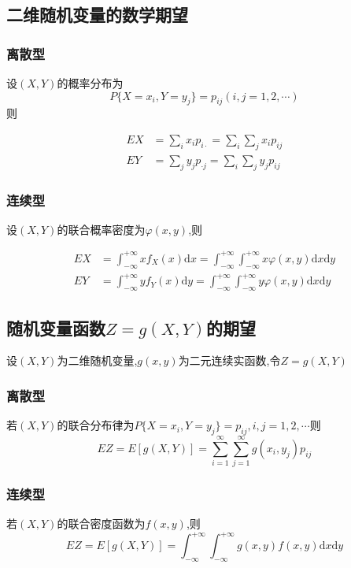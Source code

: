 \documentclass[UTF8]{ctexart}
\theoremstyle{remark}
\begin{document}
		\subsection{二维随机变量的数学期望}
		\subsubsection{离散型}
		设\((X,Y)\)的概率分布为
		\[P\{X = x_i, Y = y_j\} = p_{ij} (i,j = 1,2,\cdots)\]
		则
		
		\begin{align*}
			EX&=\sum_{i} x_i p_{i\cdot}=\sum_{i}\sum_{j} x_i p_{ij}\\
			EY&=\sum_{j} y_j p_{\cdot j}=\sum_{i}\sum_{j} y_j p_{ij}
		\end{align*}
		
		
		\subsubsection{连续型}
		设\((X,Y)\)的联合概率密度为\(\varphi(x,y)\),则
		
		\begin{align*}
			EX&=\int_{-\infty}^{+\infty} x f_X(x) \mathrm{d}x=\int_{-\infty}^{+\infty}\int_{-\infty}^{+\infty} x\varphi(x,y) \mathrm{d}x\mathrm{d}y\\
			EY&=\int_{-\infty}^{+\infty} y f_Y(x) \mathrm{d}y=\int_{-\infty}^{+\infty}\int_{-\infty}^{+\infty} y\varphi(x,y) \mathrm{d}x\mathrm{d}y
		\end{align*}
		
		
		\subsection{随机变量函数\(Z = g(X,Y)\)的期望}
		设\((X,Y)\)为二维随机变量,\(g(x,y)\)为二元连续实函数,令\(Z = g(X,Y)\)
		\subsubsection{离散型}
		若\((X,Y)\)的联合分布律为\(P\{X = x_i, Y = y_j\} = p_{ij}, i,j = 1,2,\cdots\)则
		\[
		EZ = E[g(X,Y)]=\sum_{i = 1}^{\infty}\sum_{j = 1}^{\infty} g(x_i, y_j)p_{ij}
		\]
		
		\subsubsection{连续型}
		若\((X,Y)\)的联合密度函数为\(f(x,y)\),则
		\[
		EZ = E[g(X,Y)]=\int_{-\infty}^{+\infty}\int_{-\infty}^{+\infty} g(x,y)f(x,y)\mathrm{d}x\mathrm{d}y
		\]
		
\end{document}
